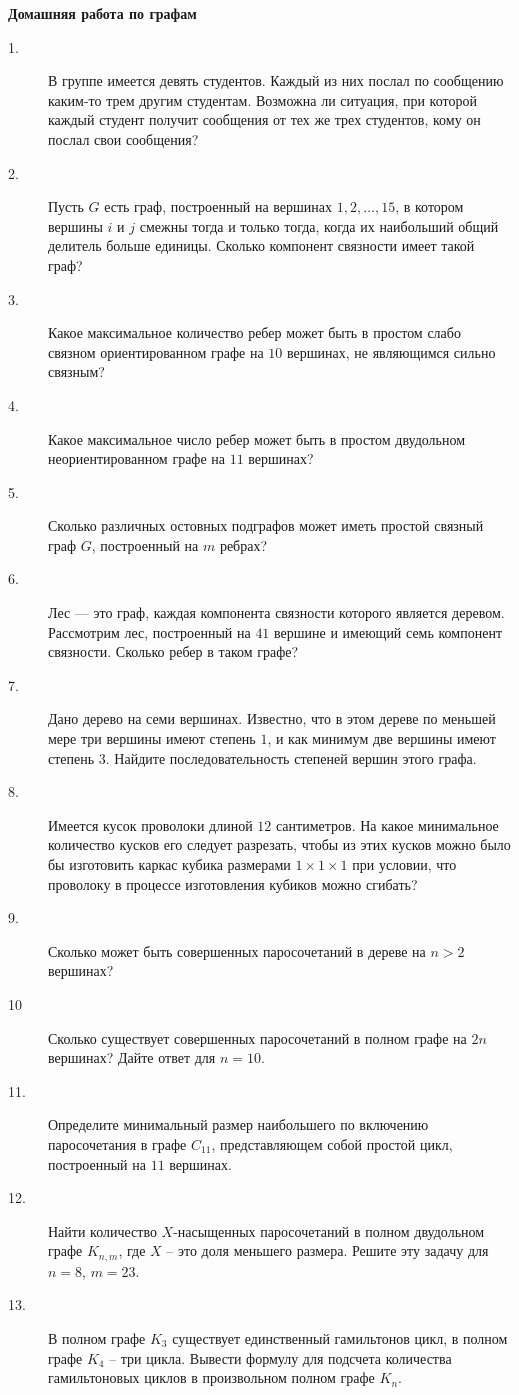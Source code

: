 \documentclass[a4paper,12pt]{article}
\theoremstyle{plain}
\theoremstyle{definition}
\theoremstyle{remark}
\begin{document}
\begin{center}
{\large \textbf{Домашняя работа по графам}}
\end{center}
\begin{description}
\item[1.]
В группе имеется девять студентов. 
Каждый из них послал по сообщению каким-то трем другим студентам. 
Возможна ли ситуация, при которой каждый студент получит 
сообщения от тех же трех студентов, 
кому он послал свои сообщения?
\item[2.] Пусть $G$ есть граф, 
построенный на вершинах $1, 2, \ldots, 15$, 
в котором вершины $i$ и $j$ смежны тогда и только тогда, 
когда их наибольший общий делитель больше единицы. 
Сколько компонент связности имеет такой граф?
\item[3.] Какое максимальное количество ребер может быть в простом
слабо связном ориентированном графе на $10$ вершинах, 
не являющимся сильно связным?
\item[4.] Какое максимальное число ребер может быть в простом 
двудольном неориентированном графе на $11$ вершинах?
\item[5.] Сколько различных остовных подграфов может иметь 
простой связный граф $G$, построенный на $m$ ребрах?
\item[6.] Лес — это граф, каждая компонента 
связности которого является деревом.\\ 
Рассмотрим лес, построенный на $41$ вершине и 
имеющий семь компонент связности. Сколько ребер в таком графе?
\item[7.] Дано дерево на семи вершинах. 
Известно, что в этом дереве по меньшей мере три вершины 
имеют степень $1$, и как минимум две вершины имеют степень $3$. 
Найдите последовательность степеней вершин этого графа.
\item[8.] Имеется кусок проволоки длиной $12$ сантиметров. 
На какое минимальное количество кусков его следует разрезать, 
чтобы из этих кусков можно было бы изготовить каркас кубика размерами 
$1 \times 1 \times 1$ при условии, 
что проволоку в процессе изготовления кубиков можно сгибать?
\item[9.] Сколько может быть совершенных паросочетаний в дереве на $n>2$ вершинах?
\item[10] Сколько существует совершенных паросочетаний в полном графе на $2n$ вершинах?
Дайте ответ для $n=10$.
\item[11.] Определите минимальный размер наибольшего по включению паросочетания в графе 
$C_{11}$, представляющем собой простой цикл, построенный на $11$ вершинах.
\item[12.] Найти количество $X$-насыщенных паросочетаний 
в полном двудольном графе $K_{n,m}$, где $X$ -- это доля меньшего размера.
Решите эту задачу для $n=8$, $m = 23$.
\item[13.] В полном графе $K_3$ существует единственный гамильтонов цикл, 
в полном графе $K_4$ -- три цикла. 
Вывести формулу для подсчета количества гамильтоновых циклов 
в произвольном полном графе $K_n$.
\end{description}
\end{document}
